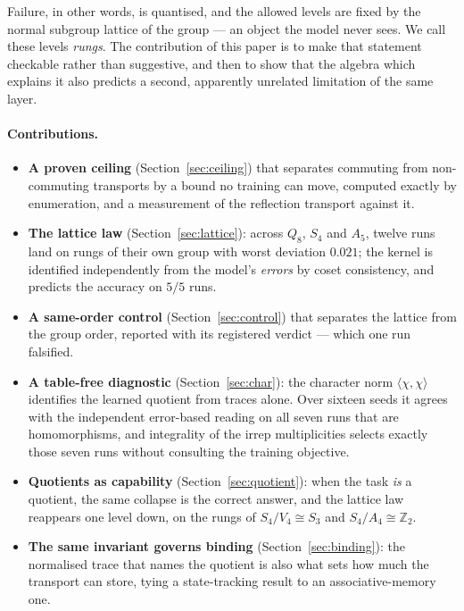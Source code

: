 \documentclass[10pt]{article}
\begin{document}
Failure, in other words, is quantised, and the allowed levels are fixed by the normal subgroup
lattice of the group --- an object the model never sees. We call these levels \emph{rungs}. The
contribution of this paper is to make that statement checkable rather than suggestive, and then to
show that the algebra which explains it also predicts a second, apparently unrelated limitation of
the same layer.

\paragraph{Contributions.}
\begin{itemize}[leftmargin=*,itemsep=1.5pt,topsep=3pt]
  \item \textbf{A proven ceiling} (Section~\ref{sec:ceiling}) that separates commuting from
        non-commuting transports by a bound no training can move, computed exactly by enumeration,
        and a measurement of the reflection transport against it.
  \item \textbf{The lattice law} (Section~\ref{sec:lattice}): across $Q_8$, $S_4$ and $A_5$, twelve
        runs land on rungs of their own group with worst deviation $0.021$; the kernel is identified
        independently from the model's \emph{errors} by coset consistency, and predicts the accuracy
        on $5/5$ runs.
  \item \textbf{A same-order control} (Section~\ref{sec:control}) that separates the lattice from the
        group order, reported with its registered verdict --- which one run falsified.
  \item \textbf{A table-free diagnostic} (Section~\ref{sec:char}): the character norm
        $\langle\chi,\chi\rangle$ identifies the learned quotient from traces alone. Over sixteen
        seeds it agrees with the independent error-based reading on all seven runs that are
        homomorphisms, and integrality of the irrep multiplicities selects exactly those seven
        runs without consulting the training objective.
  \item \textbf{Quotients as capability} (Section~\ref{sec:quotient}): when the task \emph{is} a
        quotient, the same collapse is the correct answer, and the lattice law reappears one level
        down, on the rungs of $S_4/V_4\cong S_3$ and $S_4/A_4\cong\mathbb{Z}_2$.
  \item \textbf{The same invariant governs binding} (Section~\ref{sec:binding}): the normalised trace
        that names the quotient is also what sets how much the transport can store, tying a
        state-tracking result to an associative-memory one.
\end{itemize}
\end{document}
